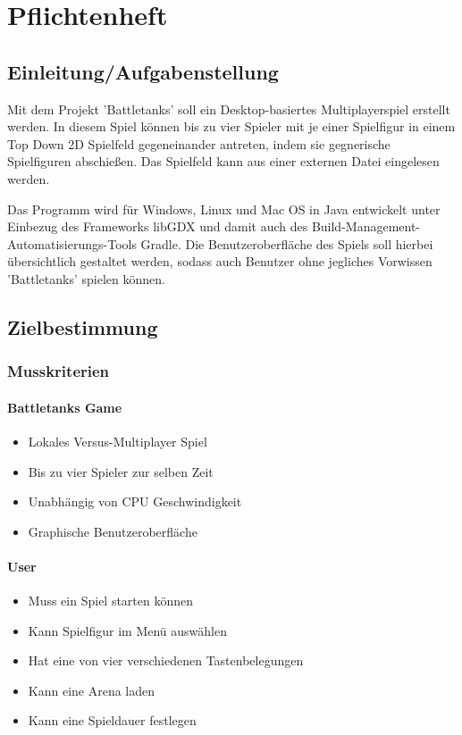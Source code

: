 \chapter{Pflichtenheft}
\section{Einleitung/Aufgabenstellung}
Mit dem Projekt 'Battletanks' soll ein Desktop-basiertes Multiplayerspiel erstellt werden.
In diesem Spiel können bis zu vier Spieler mit je einer Spielfigur in einem Top Down 2D Spielfeld gegeneinander antreten, indem sie gegnerische Spielfiguren abschießen.
Das Spielfeld kann aus einer externen Datei eingelesen werden.

Das Programm wird für Windows, Linux und Mac OS in Java entwickelt unter Einbezug des Frameworks libGDX und damit auch des Build-Management-Automatisierungs-Tools Gradle.
Die Benutzeroberfläche des Spiels soll hierbei übersichtlich gestaltet werden, 
sodass auch Benutzer ohne jegliches Vorwissen 'Battletanks' spielen können.

\section{Zielbestimmung}
\subsection{Musskriterien}
\subsubsection{Battletanks Game}
\begin{itemize}
\item Lokales Versus-Multiplayer Spiel
\item Bis zu vier Spieler zur selben Zeit
\item Unabhängig von CPU Geschwindigkeit
\item Graphische Benutzeroberfläche
\end{itemize}
\subsubsection{User}
\begin{itemize}
\item Muss ein Spiel starten können
\item Kann Spielfigur im Menü auswählen
\item Hat eine von vier verschiedenen Tastenbelegungen
\item Kann eine Arena laden
\item Kann eine Spieldauer festlegen

\end{itemize}
